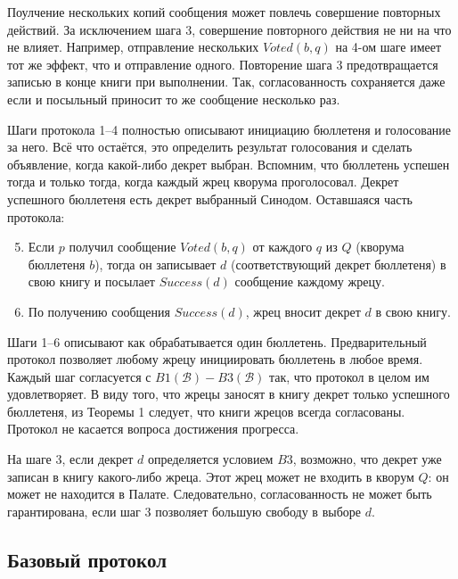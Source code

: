 \documentclass[12pt, a4paper]{article} %
\begin{document}
Поулчение нескольких копий сообщения может повлечь совершение повторных действий. За исключением шага 3, совершение повторного действия не ни на что не влияет. Например, отправление нескольких $Voted(b, q)$ на 4-ом шаге имеет тот же эффект, что и отправление одного. Повторение шага 3 предотвращается записью в конце книги при выполнении. Так, согласованность сохраняется даже если и посыльный приносит то же сообщение несколько раз.

Шаги протокола 1--4 полностью описывают инициацию бюллетеня и голосование за него. Всё что остаётся, это определить результат голосования и сделать объявление, когда какой-либо декрет выбран. Вспомним, что бюллетень успешен тогда и только тогда, когда каждый жрец кворума проголосовал. Декрет успешного бюллетеня есть декрет выбранный Синодом. Оставшаяся часть протокола:
\begin{enumerate} \setcounter{enumi}{4}
    \item Если $p$ получил сообщение $Voted(b, q)$ от каждого $q$ из $Q$ (кворума бюллетеня $b$), тогда он записывает $d$ (соответствующий декрет бюллетеня) в свою книгу и посылает $Success(d)$ сообщение каждому жрецу.

    \item По получению сообщения $Success(d)$, жрец вносит декрет $d$ в свою книгу.
\end{enumerate}

Шаги 1--6 описывают как обрабатывается один бюллетень. Предварительный протокол позволяет любому жрецу инициировать бюллетень в любое время. Каждый шаг согласуется с $B1(\mathcal{B}) - B3(\mathcal{B})$ так, что протокол в целом им удовлетворяет. В виду того, что жрецы заносят в книгу декрет только успешного бюллетеня, из Теоремы 1 следует, что книги жрецов всегда согласованы. Протокол не касается вопроса достижения прогресса.

На шаге 3, если декрет $d$ определяется условием $B3$, возможно, что декрет уже записан в книгу какого-либо жреца. Этот жрец может не входить в кворум $Q$: он может не находится в Палате. Следовательно, согласованность не может быть гарантирована, если шаг 3 позволяет большую свободу в выборе $d$.

\subsection{Базовый протокол}
\end{document}
